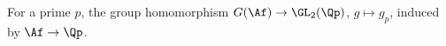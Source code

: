 For a prime $p$, the group homomorphism $G(\Af)\to\GL_2(\Qp)$, $g\mapsto g_p$, induced by $\Af\to\Qp$.
